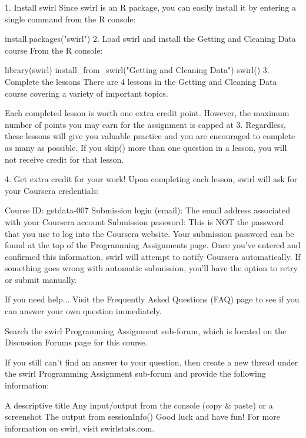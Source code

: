 1. Install swirl
Since swirl is an R package, you can easily install it by entering a single command from the R console:

install.packages("swirl")
2. Load swirl and install the Getting and Cleaning Data course
From the R console:

library(swirl)
install_from_swirl("Getting and Cleaning Data")
swirl()
3. Complete the lessons
There are 4 lessons in the Getting and Cleaning Data course covering a variety of important topics.

Each completed lesson is worth one extra credit point. However, the maximum number of points you may earn for the assignment is capped at 3. Regardless, these lessons will give you valuable practice and you are encouraged to complete as many as possible. If you skip() more than one question in a lesson, you will not receive credit for that lesson.

4. Get extra credit for your work!
Upon completing each lesson, swirl will ask for your Coursera credentials:

Course ID: getdata-007
Submission login (email): The email address associated with your Coursera account
Submission password: This is NOT the password that you use to log into the Coursera website. Your submission password can be found at the top of the Programming Assignments page.
Once you've entered and confirmed this information, swirl will attempt to notify Coursera automatically. If something goes wrong with automatic submission, you'll have the option to retry or submit manually.

If you need help...
Visit the Frequently Asked Questions (FAQ) page to see if you can answer your own question immediately.

Search the swirl Programming Assignment sub-forum, which is located on the Discussion Forums page for this course.

If you still can't find an answer to your question, then create a new thread under the swirl Programming Assignment sub-forum and provide the following information:

A descriptive title
Any input/output from the console (copy & paste) or a screenshot
The output from sessionInfo()
Good luck and have fun!
For more information on swirl, visit swirlstats.com.
